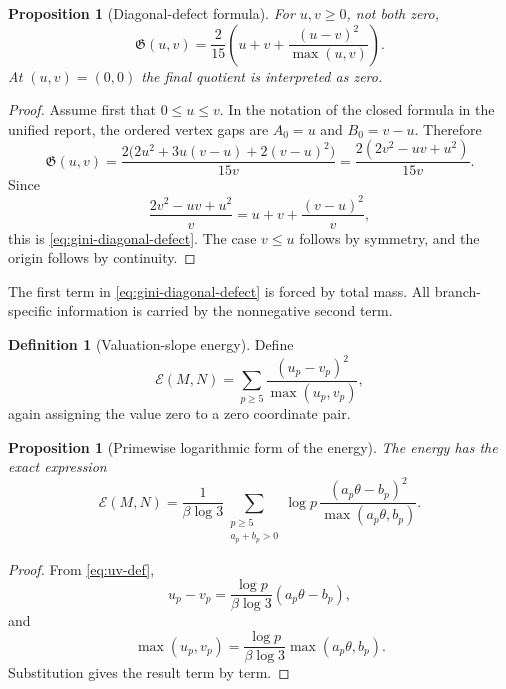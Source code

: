 \documentclass[11pt,oneside]{article}
\theoremstyle{research}
\newtheorem{proposition}[theorem]{Proposition}
\theoremstyle{definition}
\newtheorem{definition}[theorem]{Definition}
\newcommand{\E}{\mathcal E}
\begin{document}
\begin{proposition}[Diagonal-defect formula]
\label{prop:gini-first-quadrant}
For $u,v\ge0$, not both zero,
\begin{equation}
 \mathfrak G(u,v)
 =\frac{2}{15}\left(
   u+v+\frac{(u-v)^2}{\max(u,v)}
  \right).
 \label{eq:gini-diagonal-defect}
\end{equation}
At $(u,v)=(0,0)$ the final quotient is interpreted as zero.
\end{proposition}

\begin{proof}
Assume first that $0\le u\le v$.  In the notation of the closed formula in the
unified report, the ordered vertex gaps are
$A_0=u$ and $B_0=v-u$.  Therefore
\[
 \mathfrak G(u,v)
 =\frac{2\bigl(2u^2+3u(v-u)+2(v-u)^2\bigr)}{15v}
 =\frac{2(2v^2-uv+u^2)}{15v}.
\]
Since
\[
 \frac{2v^2-uv+u^2}{v}
 =u+v+\frac{(v-u)^2}{v},
\]
this is \eqref{eq:gini-diagonal-defect}.  The case $v\le u$ follows by
symmetry, and the origin follows by continuity.
\end{proof}

The first term in \eqref{eq:gini-diagonal-defect} is forced by total mass.  All
branch-specific information is carried by the nonnegative second term.

\begin{definition}[Valuation-slope energy]
\label{def:energy}
Define
\begin{equation}
 \E(M,N)
 =\sum_{p\ge5}
   \frac{(u_p-v_p)^2}{\max(u_p,v_p)},
 \label{eq:energy-def}
\end{equation}
again assigning the value zero to a zero coordinate pair.
\end{definition}

\begin{proposition}[Primewise logarithmic form of the energy]
\label{prop:energy-arithmetic-form}
The energy has the exact expression
\begin{equation}
 \E(M,N)
 =\frac1{\beta\log3}
   \sum_{\substack{p\ge5\\a_p+b_p>0}}\log p\,
   \frac{(a_p\theta-b_p)^2}{\max(a_p\theta,b_p)}.
 \label{eq:energy-arithmetic-form}
\end{equation}
\end{proposition}

\begin{proof}
From \eqref{eq:uv-def},
\[
 u_p-v_p
 =\frac{\log p}{\beta\log3}(a_p\theta-b_p),
\]
and
\[
 \max(u_p,v_p)
 =\frac{\log p}{\beta\log3}\max(a_p\theta,b_p).
\]
Substitution gives the result term by term.
\end{proof}
\end{document}
